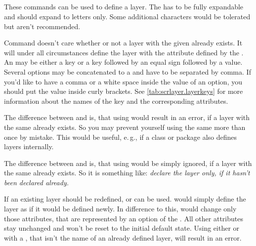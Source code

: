 \begin{Declaration}
  \\
  \\
  \\
  \\
\end{Declaration}
%
%
%
%
%
These commands can be used to define a layer. The  has to be
fully expandable and should expand to letters only. Some additional characters
would be tolerated but aren't recommended.

Command  doesn't care whether or not a layer with the
given  already exists. It will under all circumstances
define the layer with the attribute defined by the .
An
 may be either a key or a key followed by an
equal sign followed by a value. Several options may be concatenated to
a  and have to be separated by comma. If you'd like to have
a comma or a white space inside the value of an option, you should put the
value inside curly brackets. See \autoref{tab:scrlayer.layerkeys} for
more information about the names of the key and the corresponding
attributes.

The difference between  and  is,
that using  would result in an error, if a layer with
the same  already exists. So you may prevent yourself using
the same  more than once by mistake. This would be useful,
e.\,g., if a class or package also defines layers internally.

The difference between  and  is, that
using  would be simply ignored, if a layer with the same
 already exists. So it is something like: \emph{declare the
  layer only, if it hasn't been declared already.}

If an existing layer should be redefined,  or
 can be used.  would simply define
the layer as if it would be defined newly. In difference to this,
 would change only those attributes, that are represented
by an option of the . All other attributes stay unchanged
and won't be reset to the initial default state. Using either
 or  with a , that
isn't the name of an already defined layer, will result in an error.

